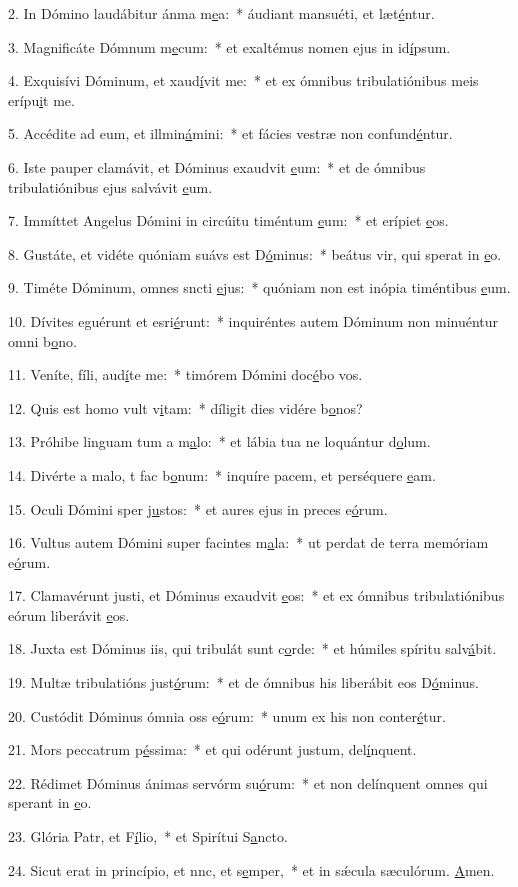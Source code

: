 2. In Dómino laudábitur ánma m\uline{e}a:~* áudiant mansuéti, et læt\uline{é}ntur.\par 
3. Magnificáte Dómnum m\uline{e}cum:~* et exaltémus nomen ejus in id\uline{í}psum.\par 
4. Exquisívi Dóminum, et xaud\uline{í}vit me:~* et ex ómnibus tribulatiónibus meis erípu\uline{i}t me.\par 
5. Accédite ad eum, et illmin\uline{á}mini:~* et fácies vestræ non confund\uline{é}ntur.\par 
6. Iste pauper clamávit, et Dóminus exaudvit \uline{e}um:~* et de ómnibus tribulatiónibus ejus salvávit \uline{e}um.\par 
7. Immíttet Angelus Dómini in circúitu timéntum \uline{e}um:~* et erípiet \uline{e}os.\par 
8. Gustáte, et vidéte quóniam suávs est D\uline{ó}minus:~* beátus vir, qui sperat in \uline{e}o.\par 
9. Timéte Dóminum, omnes sncti \uline{e}jus:~* quóniam non est inópia timéntibus \uline{e}um.\par 
10. Dívites eguérunt et esri\uline{é}runt:~* inquiréntes autem Dóminum non minuéntur omni b\uline{o}no.\par 
11. Veníte, fíli, aud\uline{í}te me:~* timórem Dómini doc\uline{é}bo vos.\par 
12. Quis est homo  vult v\uline{i}tam:~* díligit dies vidére b\uline{o}nos?\par 
13. Próhibe linguam tum a m\uline{a}lo:~* et lábia tua ne loquántur d\uline{o}lum.\par 
14. Divérte a malo, t fac b\uline{o}num:~* inquíre pacem, et perséquere \uline{e}am.\par 
15. Oculi Dómini sper j\uline{u}stos:~* et aures ejus in preces e\uline{ó}rum.\par 
16. Vultus autem Dómini super facintes m\uline{a}la:~* ut perdat de terra memóriam e\uline{ó}rum.\par 
17. Clamavérunt justi, et Dóminus exaudvit \uline{e}os:~* et ex ómnibus tribulatiónibus eórum liberávit \uline{e}os.\par 
18. Juxta est Dóminus iis, qui tribulát sunt c\uline{o}rde:~* et húmiles spíritu salv\uline{á}bit.\par 
19. Multæ tribulatións just\uline{ó}rum:~* et de ómnibus his liberábit eos D\uline{ó}minus.\par 
20. Custódit Dóminus ómnia oss e\uline{ó}rum:~* unum ex his non conter\uline{é}tur.\par 
21. Mors peccatrum p\uline{é}ssima:~* et qui odérunt justum, del\uline{í}nquent.\par 
22. Rédimet Dóminus ánimas servórm su\uline{ó}rum:~* et non delínquent omnes qui sperant in \uline{e}o.\par 
23. Glória Patr, et F\uline{í}lio,~* et Spirítui S\uline{a}ncto.\par 
24. Sicut erat in princípio, et nnc, et s\uline{e}mper,~* et in sǽcula sæculórum. \uline{A}men.\par 
